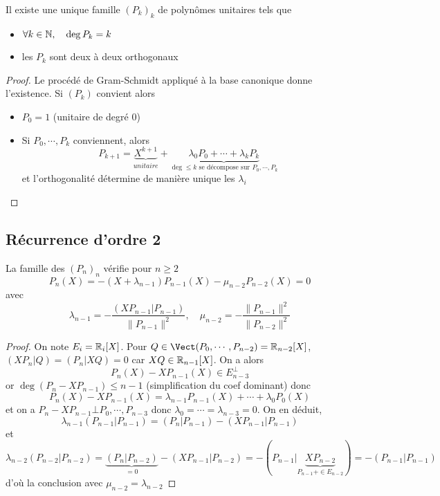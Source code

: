 \begin{prop}
Il existe une unique famille $(P_k)_k$ de polynômes unitaires tels que
\begin{itemize}
    \item $\forall k\in\mathbb N, \quad \deg P_k=k$
    \item les $P_k$ sont deux à deux orthogonaux
\end{itemize}
\end{prop}

\begin{proof}
    Le procédé de Gram-Schmidt appliqué à la base canonique donne l'existence. Si $(P_k)$ convient alors
\begin{itemize}
    \item $P_0=1$ (unitaire de degré $0$)
    \item Si $P_0, \cdots, P_k$ conviennent, alors \[
        P_{k+1}=\underbrace{X^{k+1}}_{unitaire} + \underbrace{\lambda_0P_0+\cdots +\lambda_k P_k}_{\deg \leq k \text{ se décompose sur }P_0, \cdots, P_k}
    \]
et l'orthogonalité détermine de manière unique les $\lambda_i$
\end{itemize}
\end{proof}

\subsection{Récurrence d'ordre 2}

\begin{prop}
La famille des $(P_n)_n$ vérifie pour $n\geq 2$ \[
    P_n(X)=-(X+\lambda_{n-1})P_{n-1}(X)-\mu_{n-2}P_{n-2}(X)=0
\]
avec \[
    \lambda_{n-1}=-\frac{(XP_{n-1}|P_{n-1})}{\|P_{n-1}\|^2}, \quad \mu_{n-2}=-\frac{\|P_{n-1}\|^2}{\|P_{n-2}\|^2}
\]
\end{prop}

\begin{proof} On note $E_i=\mathbb R_i[X]$.
Pour $Q\in\Vect(P_0, \cdots, P_{n-2})=\R_{n-2}[X]$, $(XP_n|Q)=(P_n|XQ)=0$ car $XQ\in\mathbb R_{n-1}[X]$. On a alors \[
    P_n(X)-XP_{n-1}(X)\in E_{n-3}^\bot
\]
or $\deg (P_n-XP_{n-1})\leq n-1$ (simplification du coef dominant) donc \[
    P_n(X)-XP_{n-1}(X)=\lambda_{n-1}P_{n-1}(X)+\cdots +\lambda_0P_0(X)
\]
et on a $P_n-XP_{n-1}\bot P_0, \cdots, P_{n-3}$ donc $\lambda_0=\cdots =\lambda_{n-3}=0$. On en déduit, \[
    \lambda_{n-1}(P_{n-1}|P_{n-1})=(P_n|P_{n-1})-(XP_{n-1}|P_{n-1})
\]
et \[
    \lambda_{n-2}(P_{n-2}|P_{n-2})=\underbrace{(P_n|P_{n-2})}_{=0}-(XP_{n-1}|P_{n-2})=-(P_{n-1}|\underbrace{XP_{n-2}}_{P_{n-1}+\in E_{n-2}})=-(P_{n-1}|P_{n-1})
\]
d'où la conclusion avec $\mu_{n-2}=\lambda_{n-2}$
\end{proof}

